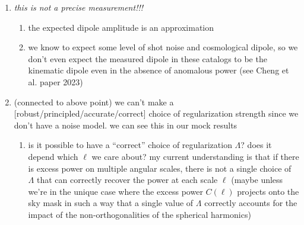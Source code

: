 \documentclass[modern]{aastex631}
\begin{document}
\begin{enumerate}
    \item \textit{this is not a precise measurement!!!}
    \begin{enumerate}
        \item the expected dipole amplitude is an approximation
        \item we know to expect some level of shot noise and cosmological dipole, so we don't even expect the measured dipole in these catalogs to be the kinematic dipole even in the absence of anomalous power (see Cheng et al. paper 2023)
    \end{enumerate}
    \item (connected to above point) we can't make a [robust/principled/accurate/correct] choice of regularization strength since we don't have a noise model. we can see this in our mock results
    \begin{enumerate}
        \item is it possible to have a ``correct'' choice of regularization $\Lambda$? does it depend which $\ell$ we care about? my current understanding is that if there is excess power on multiple angular scales, there is not a single choice of $\Lambda$ that can correctly recover the power at each scale $\ell$ (maybe unless we're in the unique case where the excess power $C(\ell)$ projects onto the sky mask in such a way that a single value of $\Lambda$ correctly accounts for the impact of the non-orthogonalities of the spherical harmonics)
    \end{enumerate}
\end{enumerate}


\end{document}
